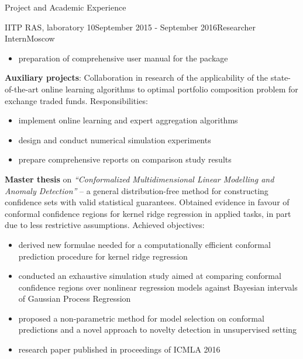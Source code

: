 \documentclass{resume} %
\begin{document}
\begin{rSection}{Project and Academic Experience}
\begin{rSubsection}{IITP RAS, laboratory 10}{September 2015 - September 2016}{Researcher Intern}{Moscow}
\begin{itemize}
        \item preparation of comprehensive user manual for the package
    \end{itemize}

    \medskip
    \item \textbf{Auxiliary projects}: Collaboration in research of the applicability
    of the state-of-the-art online learning algorithms to optimal portfolio composition
    problem for exchange traded funds. Responsibilities: \begin{itemize}
        \item implement online learning and expert aggregation algorithms

        \item design and conduct numerical simulation experiments

        \item prepare comprehensive reports on comparison study results
    \end{itemize}

    \medskip
    \item \textbf{Master thesis} on \textit{``Conformalized Multidimensional Linear
    Modelling and Anomaly Detection''} -- a general distribution-free method for
    constructing confidence sets with valid statistical guarantees. Obtained evidence
    in favour of conformal confidence regions for kernel ridge regression in applied
    tasks, in part due to less restrictive assumptions.
    Achieved objectives: \begin{itemize}
        \item derived new formulae needed for a computationally efficient conformal
        prediction procedure for kernel ridge regression

        \item conducted an exhaustive simulation study aimed at comparing conformal
        confidence regions over nonlinear regression models against Bayesian intervals
        of Gaussian Process Regression

        \item proposed a non-parametric method for model selection on conformal predictions
        and a novel approach to novelty detection in unsupervised setting

        \item research paper published in proceedings of ICMLA 2016
    \end{itemize}
\end{rSubsection}

\end{rSection}
\end{document}
